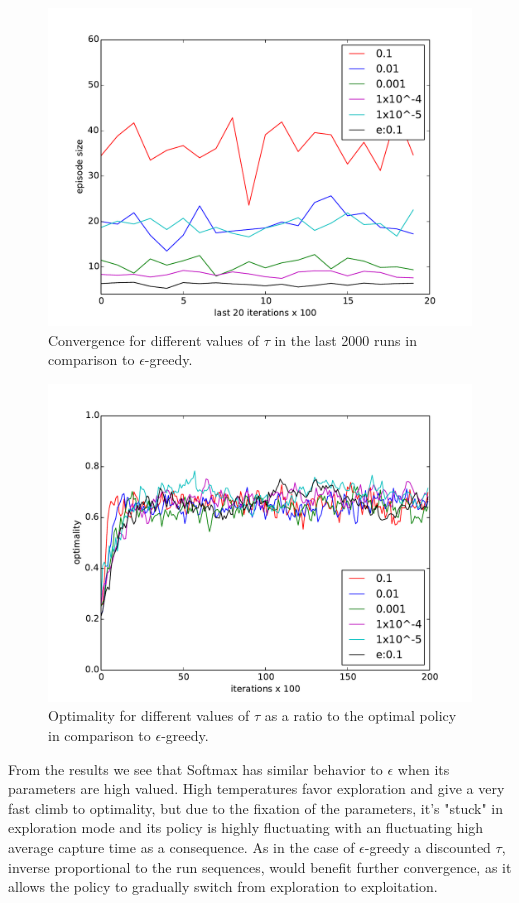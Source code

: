 \documentclass[paper=a4, fontsize=11pt]{scrartcl}
\numberwithin{equation}{section}		%
\numberwithin{figure}{section}			%
\numberwithin{table}{section}				%
\begin{document}
\begin{figure}[H] \centering
\includegraphics[scale=0.5]{softmaxlast20x100.pdf}
\caption{Convergence for different values of $\tau$ in the last 2000 runs in comparison to $\epsilon$-greedy.} 
\label{figure:softmaxlast20}
\end{figure}
\begin{figure}[H] \centering
\includegraphics[scale=0.6]{softmaxOptimality.pdf}
\caption{Optimality for different values of $\tau$ as a ratio to the optimal policy in comparison to $\epsilon$-greedy.} 
\label{figure:softmxOpti}
\end{figure}
From the results we see that Softmax has similar behavior to $\epsilon$ when its parameters are high valued. High temperatures favor exploration and give a very fast climb to optimality, but due to the fixation of the parameters, it's "stuck" in exploration mode and its policy is highly fluctuating with an fluctuating high average capture time as a consequence. As in the case of $\epsilon$-greedy a discounted $\tau$, inverse proportional to the run sequences, would benefit further convergence, as it allows the policy to gradually switch from exploration to exploitation. \\
\end{document}
